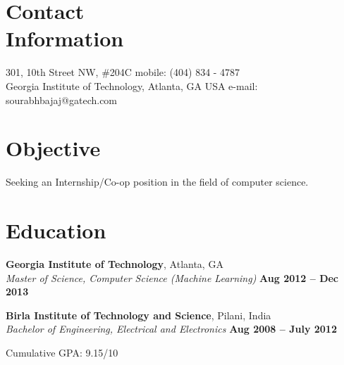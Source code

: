 \documentclass[margin,line]{resume}
\begin{document}
\addtolength{\topmargin}{.1in}
\begin{resume}

    \section{\mysidestyle Contact\\Information}

    301, 10th Street NW, \#204C                   \hfill mobile: (404) 834 - 4787       \vspace{0mm}\\\vspace{0mm}%
    Georgia Institute of Technology, Atlanta, GA USA  \hfill e-mail: sourabhbajaj@gatech.com  \vspace{0mm}\\\vspace{-4.5mm}%


    \section{\mysidestyle Objective}
    Seeking an Internship/Co-op position in the field of computer science. \\

    \section{\mysidestyle Education}
    \textbf{Georgia Institute of Technology}, Atlanta, GA \vspace{2mm}\\\vspace{1mm}%
    \textsl{Master of Science, Computer Science (Machine Learning)} \hfill \textbf{ Aug 2012 -- Dec 2013}\vspace{-3mm}\\\vspace{-1mm}

    \textbf{Birla Institute of Technology and Science}, Pilani, India \vspace{2mm}\\\vspace{1mm}%
    \textsl{Bachelor of Engineering, Electrical and Electronics} \hfill \textbf{ Aug 2008 -- July 2012}\vspace{-3mm}\\\vspace{-1mm}%
    \begin{list2}
        \item Cumulative GPA:  9.15/10 
    \end{list2}\vspace{-1.5mm}
    

\end{resume}
\end{document}
